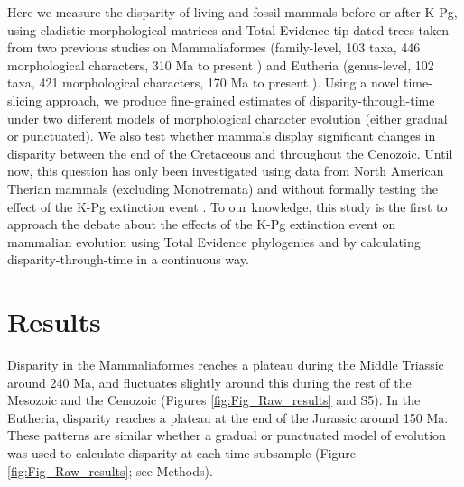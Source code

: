 \documentclass[10pt,letterpaper]{article}
\begin{document}
Here we measure the disparity of living and fossil mammals before or after K-Pg, using cladistic morphological matrices and Total Evidence tip-dated trees taken from two previous studies on Mammaliaformes (family-level, 103 taxa, 446 morphological characters, 310 Ma to present \cite{Slater2012MEE}) and Eutheria (genus-level, 102 taxa, 421 morphological characters, 170 Ma to present \cite{beckancient2014}).
Using a novel time-slicing approach, we produce fine-grained estimates of disparity-through-time under two different models of morphological character evolution (either gradual or punctuated). 
We also test whether mammals display significant changes in disparity between the end of the Cretaceous and throughout the Cenozoic.
Until now, this question has only been investigated using data from North American Therian mammals (excluding Monotremata) and without formally testing the effect of the K-Pg extinction event \cite{Wilson2013}.
To our knowledge, this study is the first to approach the debate about the effects of the K-Pg extinction event on mammalian evolution using Total Evidence phylogenies and by calculating disparity-through-time in a continuous way.

\section*{Results}
Disparity in the Mammaliaformes reaches a plateau during the Middle Triassic around 240 Ma, and fluctuates slightly around this during the rest of the Mesozoic and the Cenozoic (Figures \ref{fig:Fig_Raw_results} and S5).
In the Eutheria, disparity reaches a plateau at the end of the Jurassic around 150 Ma.
These patterns are similar whether a gradual or punctuated model of evolution was used to calculate disparity at each time subsample (Figure \ref{fig:Fig_Raw_results}; see Methods).
\end{document}
